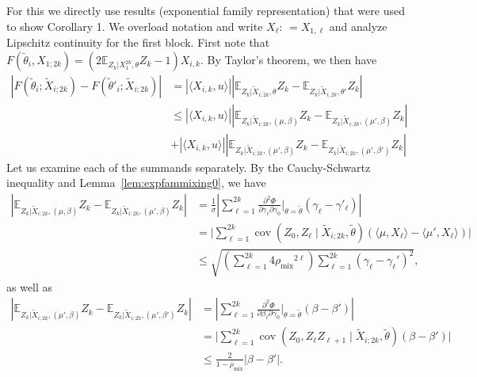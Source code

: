 \documentclass[twoside,11pt]{article}
\DeclareMathOperator{\cov}{cov}
\def\EE{ \mathbb{E} }
\newcommand{\EEzcondx}[3]{\ensuremath{\EE_{#1|#2,#3}}}
\newcommand{\mixcoef}{\ensuremath{\rho_{\mathrm{mix}}}}
\newcommand{\paramobs}{\mu}
\newcommand{\paramtrans}{\beta}
\newcommand{\paramjoint}{\theta}
\newcommand{\paramgamma}{\gamma}
\newcommand{\condcov}[3]{\cov(#1, #2 \mid #3)}
\newcommand{\defn}{: \, = }
\newcommand{\Xtil}{\ensuremath{\widetilde{X}}}
\newcommand{\funcprocgamma}[1]{F(#1;\blockXi)}
\newcommand{\blockXi}{\Xtil_{i;2k}}
\newcommand{\paramjointgamma}{\tilde{\paramjoint}}
\begin{document}
For this we directly use results (exponential family representation)
that were used to show Corollary 1. We overload notation and write
$X_\ell \defn X_{1,\ell}$ and analyze Lipschitz continuity for the
first block. First note that $F(\paramjointgamma_i, X_{1;2k}) =
(2 \EEzcondx{Z_k}{X_{1}^{2k}}{\paramjoint} Z_k -1)X_{i,k} $.  By Taylor's theorem, we
then have
\begin{align*}
|\funcprocgamma{\paramjointgamma_i} -
\funcprocgamma{\paramjointgamma'_i}| &= |\langle X_{i,k},u \rangle|
|\EEzcondx{Z_k}{\blockXi}{\paramjoint} Z_k -
\EEzcondx{Z_k}{\blockXi}{\paramjoint'} Z_k|\\ &\leq |\langle X_{i,k},u
\rangle| |\EEzcondx{Z_k}{\blockXi}{(\paramobs,\paramtrans)} Z_k -
\EEzcondx{Z_k}{\blockXi}{(\paramobs',\paramtrans)} Z_k| \\ &+ |\langle
X_{i,k},u \rangle| |\EEzcondx{Z_k}{\blockXi}{(\paramobs',\paramtrans)}
Z_k - \EEzcondx{Z_k}{\blockXi}{(\paramobs',\paramtrans')} Z_k|
\end{align*}
Let us examine  each of the summands separately.  By the
Cauchy-Schwartz inequality and Lemma~\ref{lem:expfammixing0}, we have
\begin{align*}
|\EEzcondx{Z_k}{\blockXi}{(\paramobs,\paramtrans)} Z_k -
\EEzcondx{Z_k}{\blockXi}{(\paramobs',\paramtrans)} Z_k| &=
\frac{1}{\sigma}|\sum_{\ell =1}^{2k} \frac{\partial^2 \Phi}{\partial
  \paramgamma_{\ell} \partial \paramgamma_0}\Big|_{\paramjoint =
  \tilde{\paramjoint}} (\paramgamma_{\ell} -
\paramgamma'_{\ell})|\\ 
%
&= \big| \sum_{\ell=1}^{2k}
\condcov{Z_0}{Z_\ell}{\blockXi,\tilde{\paramjoint}} (\langle
\paramobs,X_{\ell}\rangle - \langle \paramobs', X_{\ell}\rangle)
\big|\\
%
&\leq \sqrt{(\sum_{\ell=1}^{2k} 4 \mixcoef^{2\ell}) \sum_{\ell=1}^{2k}
(\paramgamma_\ell - \paramgamma_\ell')^2},
\end{align*}
as well as
\begin{align*}
|\EEzcondx{Z_k}{\blockXi}{(\paramobs',\paramtrans)} Z_k -
\EEzcondx{Z_k}{\blockXi}{(\paramobs',\paramtrans')} Z_k| &=
|\sum_{\ell =1}^{2k} \frac{\partial^2 \Phi}{\partial
  \paramtrans_{\ell} \partial\paramgamma_0}\Big|_{\paramjoint =
  \tilde{\paramjoint}} (\paramtrans - \paramtrans')|\\ &= \big|
\sum_{\ell=1}^{2k} \condcov{Z_0}{Z_\ell
  Z_{\ell+1}}{\blockXi,\tilde{\paramjoint}} (\paramtrans-\paramtrans')
\big|\\ &\leq \frac{2}{1-\mixcoef} |\paramtrans-\paramtrans'|.
\end{align*}
\end{document}
